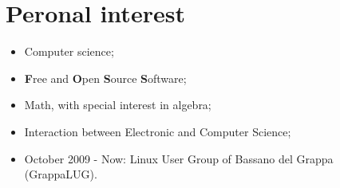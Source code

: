 \documentclass[pdftex, a4paper, 11pt]{article}
\begin{document}


\section*{Peronal interest}
\begin{itemize}
\item Computer science;
\item {\bf F}ree and {\bf O}pen {\bf S}ource {\bf S}oftware;
\item Math, with special interest in algebra;
\item Interaction between Electronic and Computer Science;
\item October 2009 - Now: Linux User Group of Bassano del Grappa (GrappaLUG).
\end{itemize}
\end{document}
